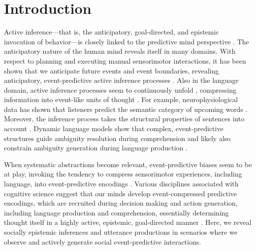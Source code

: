 \documentclass[11pt,a4paper]{article}
\begin{document}
\section{Introduction}

\noindent Active inference---that is, the anticipatory, goal-directed, and epistemic invocation of behavior---is
closely linked to the predictive mind perspective \cite{Friston:2015,Hohwy:2013,Clark:2016}. 
The anticipatory nature of the human mind reveals itself in many domains.
With respect to planning and executing manual sensorimotor interactions, 
it has been shown that we anticipate future events and event boundaries, revealing anticipatory, event-predictive active inference processes \cite{belardinelli2016s, belardinelli2018mental,Friston:2015,Hayhoe:2003,lohmann2019hands}.
Also in the language domain, active inference processes seem to continuously unfold \cite{Christiansen:2016}, compressing information into event-like units of thought \cite{Baldwin:2019tsi,Gaerdenfors:2014}.
For example, neurophysiological data has shown that listeners predict the semantic category of upcoming words \cite{federmeier2002picture}.
Moreover, the inference process takes the structural properties of sentences into account \cite{levy2008expectation}.
Dynamic language models show that complex, event-predictive structures guide ambiguity resolution during comprehension and likely also constrain ambiguity generation during language production \cite{Elman:2019}. 

When systematic abstractions become relevant, event-predictive biases seem to be at play, invoking the tendency to compress sensorimotor experiences, including language, into event-predictive encodings \cite{Baldwin:2019tsi,Butz:2016,Butz:2017a,DuBrow:2019tsi}.
Various disciplines associated with cognitive science suggest that our minds develop event-compressed predictive encodings, which are recruited during decision making and action generation, including language production and comprehension, essentially determining thought itself in a highly active, epistemic, goal-directed manner  \cite{Baldwin:2019tsi,DuBrow:2019tsi,Elsner:2019tsi,Knott:2019tsi,Papafragou:2019tsi,Zacks:2019tsi}.
Here, we reveal socially epistemic inferences and utterance productions in scenarios where we observe and actively generate social event-predictive interactions.
\end{document}
